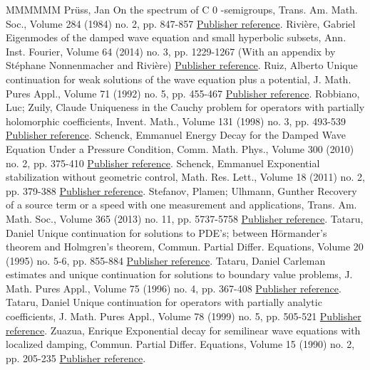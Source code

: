 \documentclass[11pt]{article}
\theoremstyle{definition}
\numberwithin{equation}{section}
\numberwithin{figure}{section}
\numberwithin{table}{section}
\begin{document}
\begin{thebibliography}{MMMMMM}
 Prüss, Jan On the spectrum of C 0 -semigroups, Trans. Am. Math. Soc., Volume 284 (1984) no. 2, pp. 847-857 \href{https://ahl.centre-mersenne.org/item/AHL_2020__3__1241_0/#Pruss}{Publisher reference}.
 Rivière, Gabriel Eigenmodes of the damped wave equation and small hyperbolic subsets, Ann. Inst. Fourier, Volume 64 (2014) no. 3, pp. 1229-1267 (With an appendix by Stéphane Nonnenmacher and Rivière) \href{https://ahl.centre-mersenne.org/item/AHL_2020__3__1241_0/#Riv}{Publisher reference}.
 Ruiz, Alberto Unique continuation for weak solutions of the wave equation plus a potential, J. Math. Pures Appl., Volume 71 (1992) no. 5, pp. 455-467 \href{https://ahl.centre-mersenne.org/item/AHL_2020__3__1241_0/#Ruiz}{Publisher reference}.
 Robbiano, Luc; Zuily, Claude Uniqueness in the Cauchy problem for operators with partially holomorphic coefficients, Invent. Math., Volume 131 (1998) no. 3, pp. 493-539 \href{https://ahl.centre-mersenne.org/item/AHL_2020__3__1241_0/#Rob-Zui}{Publisher reference}.
 Schenck, Emmanuel Energy Decay for the Damped Wave Equation Under a Pressure Condition, Comm. Math. Phys., Volume 300 (2010) no. 2, pp. 375-410 \href{https://ahl.centre-mersenne.org/item/AHL_2020__3__1241_0/#Schenckpressure}{Publisher reference}.
 Schenck, Emmanuel Exponential stabilization without geometric control, Math. Res. Lett., Volume 18 (2011) no. 2, pp. 379-388 \href{https://ahl.centre-mersenne.org/item/AHL_2020__3__1241_0/#Schenck}{Publisher reference}.
 Stefanov, Plamen; Ulhmann, Gunther Recovery of a source term or a speed with one measurement and applications, Trans. Am. Math. Soc., Volume 365 (2013) no. 11, pp. 5737-5758 \href{https://ahl.centre-mersenne.org/item/AHL_2020__3__1241_0/#Stefanov-Uhlmann}{Publisher reference}.
 Tataru, Daniel Unique continuation for solutions to PDE’s; between Hörmander’s theorem and Holmgren’s theorem, Commun. Partial Differ. Equations, Volume 20 (1995) no. 5-6, pp. 855-884 \href{https://ahl.centre-mersenne.org/item/AHL_2020__3__1241_0/#Tataru_uniq_analyticCPDE}{Publisher reference}.
 Tataru, Daniel Carleman estimates and unique continuation for solutions to boundary value problems, J. Math. Pures Appl., Volume 75 (1996) no. 4, pp. 367-408 \href{https://ahl.centre-mersenne.org/item/AHL_2020__3__1241_0/#Tataru}{Publisher reference}.
 Tataru, Daniel Unique continuation for operators with partially analytic coefficients, J. Math. Pures Appl., Volume 78 (1999) no. 5, pp. 505-521 \href{https://ahl.centre-mersenne.org/item/AHL_2020__3__1241_0/#Tataru_uniq_analyticJMPA}{Publisher reference}.
 Zuazua, Enrique Exponential decay for semilinear wave equations with localized damping, Commun. Partial Differ. Equations, Volume 15 (1990) no. 2, pp. 205-235 \href{https://ahl.centre-mersenne.org/item/AHL_2020__3__1241_0/#Zuazua}{Publisher reference}.
\end{thebibliography}
\end{document}
